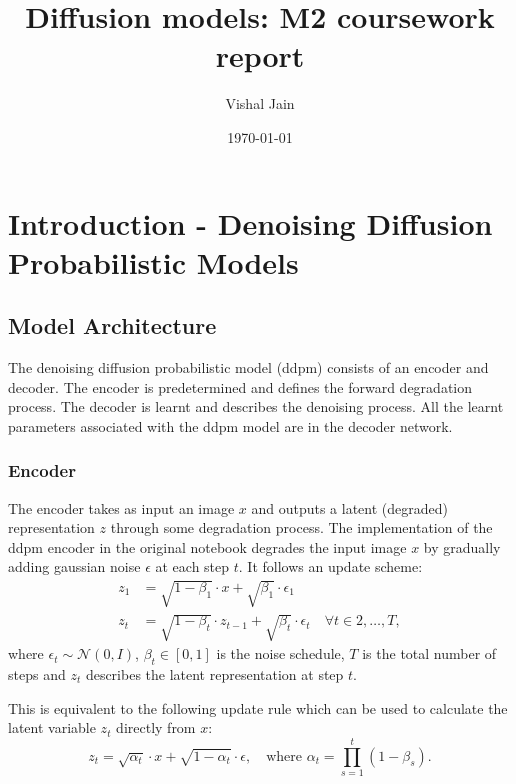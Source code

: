 \documentclass[11pt]{article}
\title{Diffusion models: M2 coursework report}
\author{Vishal Jain}
\date{\today}
\begin{document}
\maketitle

\tableofcontents

\newpage
\section{Introduction - Denoising Diffusion Probabilistic Models}
\subsection{Model Architecture}
The denoising diffusion probabilistic model (ddpm) consists of an encoder and decoder.
The encoder is predetermined and defines the forward degradation process. The decoder is learnt and describes the denoising process. All the learnt parameters associated with the ddpm model are in the decoder network.
\subsubsection{Encoder}
The encoder takes as input an image $x$ and outputs a latent (degraded) representation $z$ through some degradation process. The implementation of the ddpm encoder in the original notebook degrades the input image $x$ by gradually adding gaussian noise $\epsilon$ at each step $t$. It follows an update scheme:
\begin{equation}
    \begin{aligned}
        z_1 &= \sqrt{1-\beta_1} \cdot x + \sqrt{\beta_1} \cdot \epsilon_1 \\
        z_t &= \sqrt{1-\beta_t} \cdot z_{t-1} + \sqrt{\beta_t} \cdot \epsilon_t \quad \forall t \in 2, \ldots, T,
    \end{aligned}
    \end{equation}
    where $\epsilon_t \sim \mathcal{N}(0, I)$, $\beta_t \in [0,1]$ is the noise schedule, $T$ is the total number of steps and $z_t$ describes the latent representation at step $t$.

This is equivalent to the following update rule which can be used to calculate the latent variable $z_t$ directly from $x$:
\begin{equation}
    z_t = \sqrt{\alpha_t} \cdot x + \sqrt{1 - \alpha_t} \cdot \epsilon, \quad \text{where } \alpha_t = \prod_{s=1}^{t} (1 - \beta_s).
    \label{eq:z_t_alpha}
\end{equation}
\end{document}
